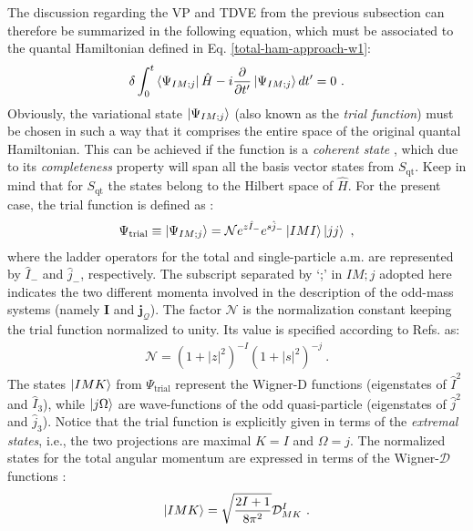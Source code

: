 The discussion regarding the VP and TDVE from the previous subsection can therefore be summarized in the following equation, which must be associated to the quantal Hamiltonian defined in Eq. \ref{total-ham-approach-w1}:
\begin{align}
    \delta\int_0^t\bra{\Psi_{IM;j}}\hat{H}-i\frac{\partial}{\partial t'}\ket{\Psi_{IM;j}}dt'=0\ .
    \label{tdve-approach-w1}
\end{align}
Obviously, the variational state $\ket{\Psi_{IM;j}}$ (also known as the \emph{trial function}) must be chosen in such a way that it comprises the entire space of the original quantal Hamiltonian. This can be achieved if the function is a \emph{coherent state} \cite{glauber1963coherent}, which due to its \emph{completeness} property will span all the basis vector states from $S_\text{qt}$. Keep in mind that for $S_\text{qt}$ the states belong to the Hilbert space of $\hat{H}$. For the present case, the trial function is defined as \cite{raduta2017semiclassical}:
\begin{align}
    \Psi_\text{trial}\equiv\ket{\Psi_{IM;j}}=\mathcal{N}e^{z\hat{I}_-}e^{s\hat{j}_-}\ket{IMI}\ket{jj}\ ,
    \label{trial-function-appeoach-w1}
\end{align}
where the ladder operators for the total and single-particle a.m. are represented by $\hat{I}_-$ and $\hat{j}_-$, respectively. The subscript separated by `;' in $IM;j$ adopted here indicates the two different momenta involved in the description of the odd-mass systems (namely $\mathbf{I}$ and $\mathbf{j}_\mathcal{Q}$). The factor $\mathcal{N}$ is the normalization constant keeping the trial function normalized to unity. Its value is specified according to Refs. \cite{raduta2007semiclassical,raduta2020new} as:
\begin{align}
    \mathcal{N}=\left(1+|z|^2\right)^{-I}\left(1+|s|^2\right)^{-j}\ .
\end{align}
The states $\ket{IMK}$ from $\Psi_\text{trial}$ represent the Wigner-D functions (eigenstates of $\hat{I}^2$ and $\hat{I}_3$), while $\ket{j\Omega}$ are wave-functions of the odd quasi-particle (eigenstates of $\hat{j}^2$ and $\hat{j}_3$). Notice that the trial function is explicitly given in terms of the \emph{extremal states}, i.e., the two projections are maximal $K=I$ and $\Omega=j$. The normalized states for the total angular momentum are expressed in terms of the Wigner-$\mathcal{D}$ functions \cite{ring2004nuclear}:
\begin{align}
    \ket{IMK}=\sqrt{\frac{2I+1}{8\pi^2}}\mathcal{D}_{MK}^I\ .
    \label{IMK-wigner-functions}
\end{align}

